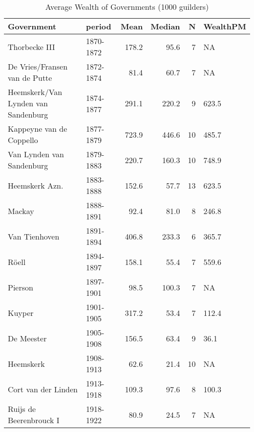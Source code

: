 \begin{table}[ht]
\centering
\begin{tabular}{llrrrl}
  \hline
Government & period & Mean & Median & N & WealthPM \\ 
  \hline
Thorbecke III & 1870-1872 & 178.2 & 95.6 &  7 & NA \\ 
  De Vries/Fransen van de Putte & 1872-1874 & 81.4 & 60.7 &  7 & NA \\ 
  Heemskerk/Van Lynden van Sandenburg & 1874-1877 & 291.1 & 220.2 &  9 & 623.5 \\ 
  Kappeyne van de Coppello & 1877-1879 & 723.9 & 446.6 & 10 & 485.7 \\ 
  Van Lynden van Sandenburg & 1879-1883 & 220.7 & 160.3 & 10 & 748.9 \\ 
  Heemskerk Azn. & 1883-1888 & 152.6 & 57.7 & 13 & 623.5 \\ 
  Mackay & 1888-1891 & 92.4 & 81.0 &  8 & 246.8 \\ 
  Van Tienhoven & 1891-1894 & 406.8 & 233.3 &  6 & 365.7 \\ 
  Röell & 1894-1897 & 158.1 & 55.4 &  7 & 559.6 \\ 
  Pierson & 1897-1901 & 98.5 & 100.3 &  7 & NA \\ 
  Kuyper & 1901-1905 & 317.2 & 53.4 &  7 & 112.4 \\ 
  De Meester & 1905-1908 & 156.5 & 63.4 &  9 & 36.1 \\ 
  Heemskerk & 1908-1913 & 62.6 & 21.4 & 10 & NA \\ 
  Cort van der Linden & 1913-1918 & 109.3 & 97.6 &  8 & 100.3 \\ 
  Ruijs de Beerenbrouck I & 1918-1922 & 80.9 & 24.5 &  7 & NA \\ 
   \hline
\end{tabular}
\caption{Average Wealth of Governments (1000 guilders)} 
\end{table}
